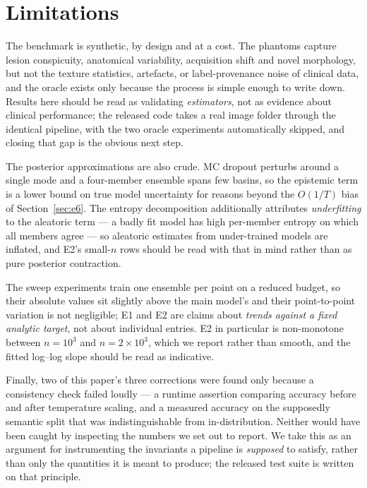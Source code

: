\documentclass{article}
\begin{document}
\section{Limitations}

The benchmark is synthetic, by design and at a cost. The phantoms capture lesion
conspicuity, anatomical variability, acquisition shift and novel morphology, but
not the texture statistics, artefacts, or label-provenance noise of clinical
data, and the oracle exists only because the process is simple enough to write
down. Results here should be read as validating \emph{estimators}, not as
evidence about clinical performance; the released code takes a real image folder
through the identical pipeline, with the two oracle experiments automatically
skipped, and closing that gap is the obvious next step.

The posterior approximations are also crude. MC dropout perturbs around a single
mode and a four-member ensemble spans few basins, so the epistemic term is a lower
bound on true model uncertainty for reasons beyond the $O(1/T)$ bias of
Section~\ref{sec:e6}. The entropy decomposition additionally attributes
\emph{underfitting} to the aleatoric term --- a badly fit model has high
per-member entropy on which all members agree --- so aleatoric estimates from
under-trained models are inflated, and E2's small-$n$ rows should be read with
that in mind rather than as pure posterior contraction.

The sweep experiments train one ensemble per point on a reduced budget, so their
absolute values sit slightly above the main model's and their point-to-point
variation is not negligible; E1 and E2 are claims about \emph{trends against a
fixed analytic target}, not about individual entries. E2 in particular is
non-monotone between $n = 10^3$ and $n = 2\times10^3$, which we report rather than
smooth, and the fitted log--log slope should be read as indicative.

Finally, two of this paper's three corrections were found only because a
consistency check failed loudly --- a runtime assertion comparing accuracy before
and after temperature scaling, and a measured accuracy on the supposedly semantic
split that was indistinguishable from in-distribution. Neither would have been
caught by inspecting the numbers we set out to report. We take this as an argument
for instrumenting the invariants a pipeline is \emph{supposed} to satisfy, rather
than only the quantities it is meant to produce; the released test suite is
written on that principle.
\end{document}
